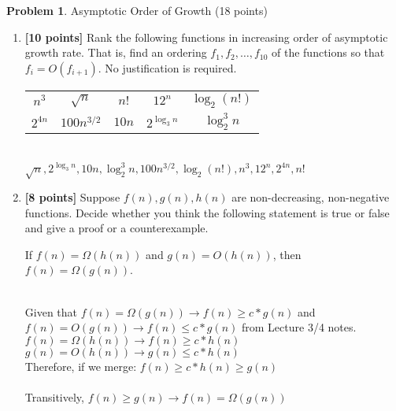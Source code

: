 \documentclass[11pt]{article}
\theoremstyle{definition}
\theoremstyle{theorem}
\newtheorem{prob}{Problem}
\newcommand{\solution}{\medskip\noindent{\color{DarkBlue}\textbf{Solution:}}}
\begin{document}
\newpage
\begin{prob} Asymptotic Order of Growth (18 points) \end{prob}
\begin{enumerate}[label=(\alph*)]
\item \textbf{[10 points]} Rank the following functions in increasing order of asymptotic growth rate.  That is, find an ordering $f_1, f_2, \ldots, f_{10}$ of the functions so that $f_i = O(f_{i+1})$. No justification is required.

\begin{center}
\begin{tabular}{ccccc}
$n^3$ & $\sqrt{n}$ & $n!$ & $12^n$ & $\log_2 (n!)$  \\
$2^{4n}$ & $100 n^{3/2}$ & $10n$ & $2^{\log_3 n}$ & $\log_2^3 n$
\end{tabular}
\end{center}

\solution \\

$\sqrt{n}, 2^{\log_3 n}, 10n, \log_2^3 n, 100n^{3/2}, \log_2 (n!), n^3, 12^n, 2^{4n}, n!$

\item  \textbf{[8 points]} Suppose $f(n), g(n), h(n)$ are non-decreasing, non-negative functions. Decide whether you think the following statement is true or false and give a proof or a counterexample.

If $f(n) = \Omega(h(n))$ and $g(n) = O(h(n))$, then $f(n) = \Omega(g(n))$.

\solution \\
Given that $f(n) = \Omega(g(n)) \rightarrow f(n) \ge c * g(n)$ and $f(n) = O(g(n)) \rightarrow f(n) \le c * g(n)$ from Lecture 3/4 notes. \\

 $f(n) = \Omega(h(n)) \rightarrow f(n) \ge c * h(n)$ \\
 $g(n) = O(h(n)) \rightarrow g(n) \le c * h(n)$ \\
 Therefore, if we merge: $f(n) \ge c * h(n) \ge g(n)$ \\\\
 Transitively, $f(n) \ge g(n) \rightarrow f(n) = \Omega(g(n))$

\end{enumerate}
\end{document}
